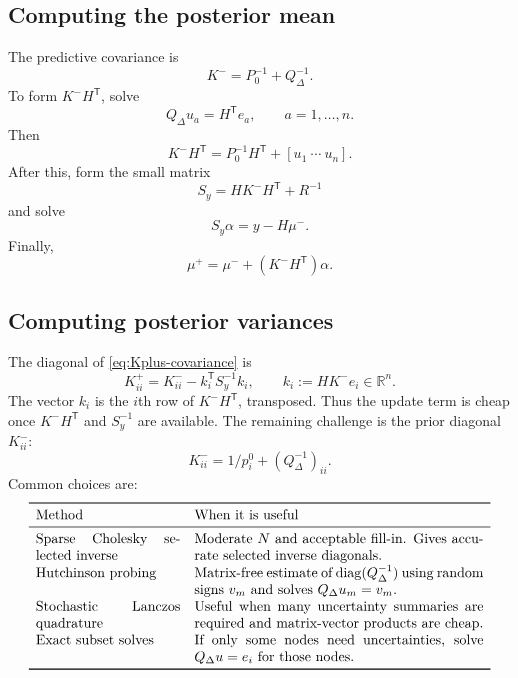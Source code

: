 \documentclass[11pt]{article}
\numberwithin{equation}{section}
\newcommand{\R}{\mathbb{R}}
\newcommand{\diag}{\operatorname{diag}}
\newcommand{\transpose}{^{\mathsf T}}
\begin{document}
\subsection{Computing the posterior mean}

The predictive covariance is
\[
  K^-=P_0^{-1}+Q_\Delta^{-1}.
\]
To form $K^-H\transpose$, solve
\begin{equation}
  Q_\Delta u_a=H\transpose e_a,
  \qquad a=1,\ldots,n.
  \label{eq:n-solves}
\end{equation}
Then
\begin{equation}
  K^-H\transpose
  =P_0^{-1}H\transpose+[u_1\ \cdots\ u_n].
  \label{eq:KminusH-columns}
\end{equation}
After this, form the small matrix
\begin{equation}
  S_y=HK^-H\transpose+R^{-1}
  \label{eq:small-Sy}
\end{equation}
and solve
\begin{equation}
  S_y\alpha=y-H\mu^-.
  \label{eq:small-alpha}
\end{equation}
Finally,
\begin{equation}
  \mu^+=\mu^-+(K^-H\transpose)\alpha.
  \label{eq:large-mu}
\end{equation}

\subsection{Computing posterior variances}

The diagonal of \eqref{eq:Kplus-covariance} is
\begin{equation}
  K^+_{ii}=K^-_{ii}-k_i\transpose S_y^{-1}k_i,
  \qquad
  k_i:=HK^-e_i\in\R^n.
  \label{eq:posterior-diag-formula}
\end{equation}
The vector $k_i$ is the $i$th row of $K^-H\transpose$, transposed.  Thus the update term is cheap once $K^-H\transpose$ and $S_y^{-1}$ are available.  The remaining challenge is the prior diagonal $K^-_{ii}$:
\begin{equation}
  K^-_{ii}=1/p_i^0+(Q_\Delta^{-1})_{ii}.
  \label{eq:prior-diag}
\end{equation}
Common choices are:
\[
\begin{array}{p{0.30\linewidth}p{0.60\linewidth}}
\toprule
\text{Method}&\text{When it is useful}\\
\midrule
Sparse Cholesky selected inverse&Moderate $N$ and acceptable fill-in.  Gives accurate selected inverse diagonals.\\
Hutchinson probing&Matrix-free estimate of $\diag(Q_\Delta^{-1})$ using random signs $v_m$ and solves $Q_\Delta u_m=v_m$.\\
Stochastic Lanczos quadrature&Useful when many uncertainty summaries are required and matrix-vector products are cheap.\\
Exact subset solves&If only some nodes need uncertainties, solve $Q_\Delta u=e_i$ for those nodes.\\
\bottomrule
\end{array}
\]
\end{document}
